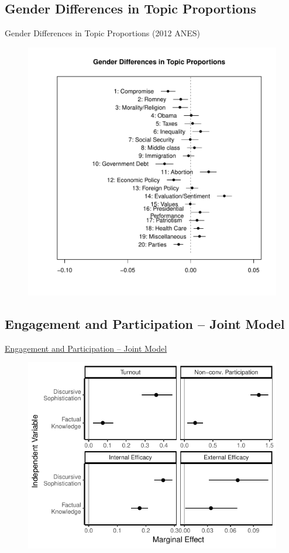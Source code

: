 \subsection{Gender Differences in Topic Proportions}
\begin{frame}{Gender Differences in Topic Proportions (2012 ANES)}\label{stm_gender}
  \begin{figure}
  \includegraphics[height=.85\textheight]{fig/stm_gender.pdf}
  \end{figure}
\end{frame}

\subsection{Engagement and Participation -- Joint Model}
\begin{frame}{\hyperlink{engagement}{Engagement and Participation -- Joint Model}}\label{engagement_joint}
  \begin{figure}
  \includegraphics{fig/knoweff_joint.pdf}
  \end{figure}
\end{frame}

